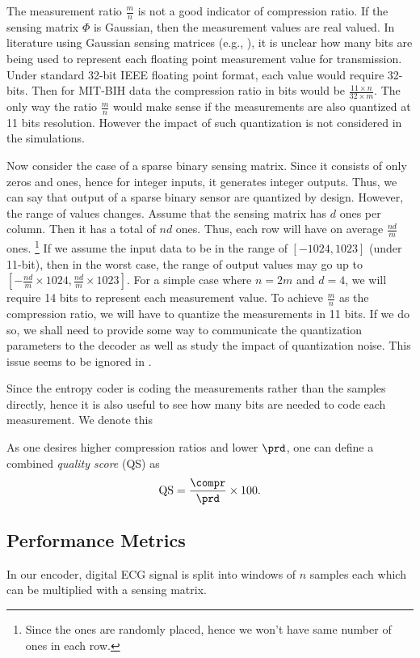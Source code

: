 The measurement ratio $\frac{m}{n}$ is not a
good indicator of compression ratio.
If the sensing matrix $\Phi$ is Gaussian,
then the measurement values are real valued.
In literature using Gaussian sensing matrices
(e.g., \cite{zhang2016comparison}),
it is unclear how many bits are
being used to represent each floating point measurement value
for transmission.
Under standard 32-bit IEEE floating point format,
each value would require 32-bits.
Then for MIT-BIH data the compression ratio in bits
would be $\frac{11 \times n}{32 \times m}$.
The only way the ratio $\frac{m}{n}$ would make sense
if the measurements are also quantized at 11 bits
resolution. However the impact of such quantization
is not considered in the simulations.

Now consider the case of a sparse binary sensing
matrix. Since it consists of only zeros and ones,
hence for integer inputs, it generates integer
outputs. Thus, we can say that output of a sparse
binary sensor are quantized by design.
However, the range of values changes.
Assume that the sensing matrix has $d$ ones per column.
Then it has a total of $n d$ ones. Thus, each row
will have on average $\frac{n d}{m}$ ones.
\footnote{Since the ones are randomly placed, hence
we won't have same number of ones in each row.}
If we assume the input data to be in the range
of $[-1024, 1023]$ (under 11-bit), then in the
worst case, the range of output values may go
up to$[-\frac{n d}{m} \times 1024, \frac{n d}{m} \times 1023]$.
For a simple case where $n = 2m$ and $d=4$, we will require
14 bits to represent each measurement value.
To achieve $\frac{m}{n}$ as the compression ratio, we will
have to quantize the measurements in 11 bits. If we do so,
we shall need to provide some way to communicate the quantization
parameters to the decoder as well as study the impact of
quantization noise.
This issue seems to be ignored in \cite{zhang2012compressed}.


Since the entropy coder is coding the measurements rather than
the samples directly, hence it is also useful to see how
many bits are needed to code each measurement. We
denote this

As one desires higher compression ratios and lower
$\prd$, one can define a combined \emph{quality score} (QS) as
\begin{equation}
\text{QS} = \frac{\compr}{\prd} \times 100.
\end{equation}
\subsection{Performance Metrics}
\label{sec:codec:metrics}
In our encoder, digital ECG signal is split into windows
of $n$ samples each which can be multiplied
with a sensing matrix. 


